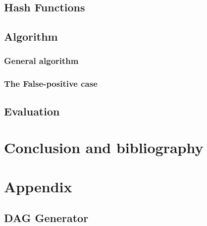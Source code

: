 \documentclass[a4paper,10pt]{report}
\theoremstyle{definition}
\theoremstyle{definition}
\begin{document}
\section{Hash Functions}

\section{Algorithm}
\subsection{General algorithm}

\subsection{The False-positive case}

\section{Evaluation}
\chapter{Conclusion and bibliography}
%   
\chapter{Appendix}
\section{DAG Generator}
\label{sec:daggen}

%   
\end{document}
